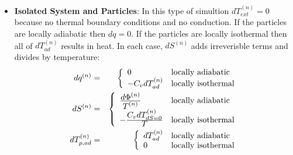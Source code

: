 \documentclass[11pt]{book}
\begin{document}
\begin{itemize}

\item {\bf Isolated System and Particles}:
In this type of simultion $dT_{ext}^{(n)}=0$ because no thermal boundary conditions and no conduction. If the particles are locally adiabatic then $dq=0$. If the particles are locally isothermal then all of $dT_{ad}^{(n)}$ results in heat. In each case, $dS^{(n)}$ adds irreverisble terms and divides by temperature:
\begin{eqnarray}
           dq^{(n)} & = & \left\{ \begin{array}{ll}
                0 & {\rm locally\ adiabatic} \\
                -C_vdT_{ad}^{(n)} & {\rm locally\ isothermal}
                \end{array} \right.\\
           dS^{(n)} & = & \left\{ \begin{array}{ll}
                {\displaystyle d\Phi^{(n)}\over \displaystyle T^{(n)}} & {\rm locally\ adiabatic} \\
                -{\displaystyle C_vdT_{dS=0}^{(n)}\over \displaystyle T}  & {\rm locally\ isothermal}
                \end{array} \right. \\
           dT_{p,ad}^{(n)} & = & \left\{ \begin{array}{ll}
                dT_{ad}^{(n)} & {\rm locally\ adiabatic} \\
                0 & {\rm locally\ isothermal}
                \end{array} \right.
\end{eqnarray}


\end{itemize}
\end{document}
